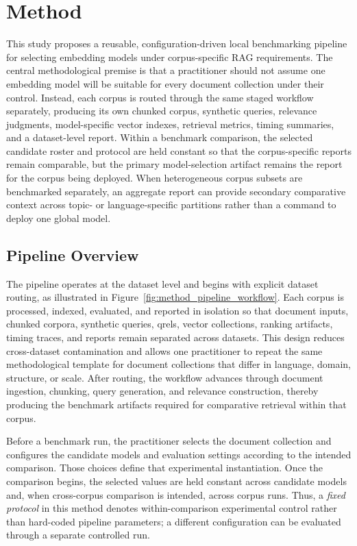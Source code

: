 \section{Method}\label{method}

This study proposes a reusable, configuration-driven local benchmarking pipeline for selecting embedding models under corpus-specific RAG requirements. The central methodological premise is that a practitioner should not assume one embedding model will be suitable for every document collection under their control. Instead, each corpus is routed through the same staged workflow separately, producing its own chunked corpus, synthetic queries, relevance judgments, model-specific vector indexes, retrieval metrics, timing summaries, and a dataset-level report. Within a benchmark comparison, the selected candidate roster and protocol are held constant so that the corpus-specific reports remain comparable, but the primary model-selection artifact remains the report for the corpus being deployed. When heterogeneous corpus subsets are benchmarked separately, an aggregate report can provide secondary comparative context across topic- or language-specific partitions rather than a command to deploy one global model.

\subsection{Pipeline Overview}\label{pipeline-overview}

The pipeline operates at the dataset level and begins with explicit dataset routing, as illustrated in Figure~\ref{fig:method_pipeline_workflow}. Each corpus is processed, indexed, evaluated, and reported in isolation so that document inputs, chunked corpora, synthetic queries, qrels, vector collections, ranking artifacts, timing traces, and reports remain separated across datasets. This design reduces cross-dataset contamination and allows one practitioner to repeat the same methodological template for document collections that differ in language, domain, structure, or scale. After routing, the workflow advances through document ingestion, chunking, query generation, and relevance construction, thereby producing the benchmark artifacts required for comparative retrieval within that corpus.

Before a benchmark run, the practitioner selects the document collection and configures the candidate models and evaluation settings according to the intended comparison. Those choices define that experimental instantiation. Once the comparison begins, the selected values are held constant across candidate models and, when cross-corpus comparison is intended, across corpus runs. Thus, a \emph{fixed protocol} in this method denotes within-comparison experimental control rather than hard-coded pipeline parameters; a different configuration can be evaluated through a separate controlled run.

